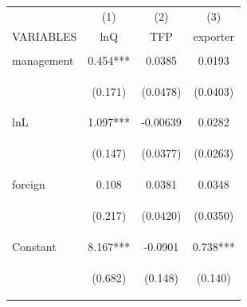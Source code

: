 \begin{center}
\begin{tabular}{lccc} \hline
 & (1) & (2) & (3) \\
VARIABLES & lnQ & TFP & exporter \\ \hline
\vspace{4pt} & \begin{footnotesize}\end{footnotesize} & \begin{footnotesize}\end{footnotesize} & \begin{footnotesize}\end{footnotesize} \\
management & 0.454*** & 0.0385 & 0.0193 \\
\vspace{4pt} & \begin{footnotesize}(0.171)\end{footnotesize} & \begin{footnotesize}(0.0478)\end{footnotesize} & \begin{footnotesize}(0.0403)\end{footnotesize} \\
lnL & 1.097*** & -0.00639 & 0.0282 \\
\vspace{4pt} & \begin{footnotesize}(0.147)\end{footnotesize} & \begin{footnotesize}(0.0377)\end{footnotesize} & \begin{footnotesize}(0.0263)\end{footnotesize} \\
foreign & 0.108 & 0.0381 & 0.0348 \\
\vspace{4pt} & \begin{footnotesize}(0.217)\end{footnotesize} & \begin{footnotesize}(0.0420)\end{footnotesize} & \begin{footnotesize}(0.0350)\end{footnotesize} \\
Constant & 8.167*** & -0.0901 & 0.738*** \\
 & \begin{footnotesize}(0.682)\end{footnotesize} & \begin{footnotesize}(0.148)\end{footnotesize} & \begin{footnotesize}(0.140)\end{footnotesize} \\

\end{tabular}
\end{center}
